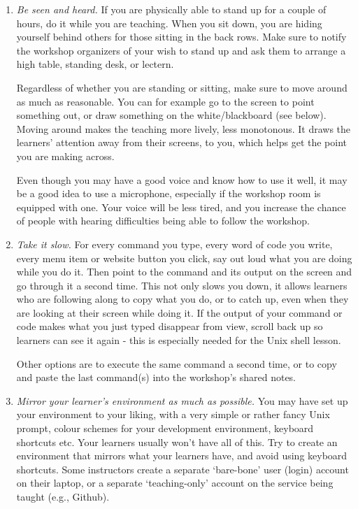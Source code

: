 \begin{enumerate}

\item
  \emph{Be seen and heard.}  If you are physically able to stand up
  for a couple of hours, do it while you are teaching. When you sit
  down, you are hiding yourself behind others for those sitting in the
  back rows. Make sure to notify the workshop organizers of your wish
  to stand up and ask them to arrange a high table, standing desk, or
  lectern.

  Regardless of whether you are standing or sitting, make sure to move
  around as much as reasonable. You can for example go to the screen
  to point something out, or draw something on the white/blackboard
  (see below). Moving around makes the teaching more lively, less
  monotonous.  It draws the learners' attention away from their
  screens, to you, which helps get the point you are making across.

  Even though you may have a good voice and know how to use it well,
  it may be a good idea to use a microphone, especially if the
  workshop room is equipped with one. Your voice will be less tired,
  and you increase the chance of people with hearing difficulties
  being able to follow the workshop.

\item
  \emph{Take it slow.}  For every command you type, every word of code
  you write, every menu item or website button you click, say out loud
  what you are doing while you do it. Then point to the command and
  its output on the screen and go through it a second time. This not
  only slows you down, it allows learners who are following along to
  copy what you do, or to catch up, even when they are looking at
  their screen while doing it. If the output of your command or code
  makes what you just typed disappear from view, scroll back up so
  learners can see it again - this is especially needed for the Unix
  shell lesson.

  Other options are to execute the same command a second time, or to
  copy and paste the last command(s) into the workshop's shared notes.

\item
  \emph{Mirror your learner's environment as much as possible.}  You
  may have set up your environment to your liking, with a very simple
  or rather fancy Unix prompt, colour schemes for your development
  environment, keyboard shortcuts etc. Your learners usually won't
  have all of this. Try to create an environment that mirrors what
  your learners have, and avoid using keyboard shortcuts. Some
  instructors create a separate `bare-bone' user (login) account on
  their laptop, or a separate `teaching-only' account on the service
  being taught (e.g., Github).


\end{enumerate}
